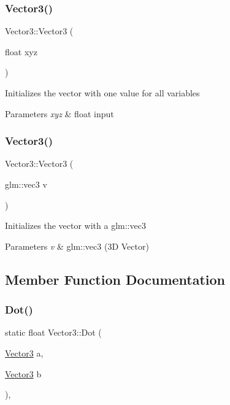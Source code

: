 \subsubsection{\texorpdfstring{Vector3()}{Vector3()}\hspace{0.1cm}{\footnotesize\ttfamily [3/4]}}
{\footnotesize\ttfamily Vector3\+::\+Vector3 (\begin{DoxyParamCaption}\item[{float}]{xyz }\end{DoxyParamCaption})\hspace{0.3cm}{\ttfamily [inline]}}

Initializes the vector with one value for all variables 
\begin{DoxyParams}{Parameters}
{\em xyz} & float input \\
\hline
\end{DoxyParams}
\mbox{\label{struct_vector3_a77b6e181107724282b7d95a4d22cfc59}} 
\subsubsection{\texorpdfstring{Vector3()}{Vector3()}\hspace{0.1cm}{\footnotesize\ttfamily [4/4]}}
{\footnotesize\ttfamily Vector3\+::\+Vector3 (\begin{DoxyParamCaption}\item[{glm\+::vec3}]{v }\end{DoxyParamCaption})\hspace{0.3cm}{\ttfamily [inline]}}

Initializes the vector with a glm\+::vec3 
\begin{DoxyParams}{Parameters}
{\em v} & glm\+::vec3 (3D Vector) \\
\hline
\end{DoxyParams}


\subsection{Member Function Documentation}
\mbox{\label{struct_vector3_abc6241be068bbf878c7b12b16582a1f4}} 
\subsubsection{\texorpdfstring{Dot()}{Dot()}}
{\footnotesize\ttfamily static float Vector3\+::\+Dot (\begin{DoxyParamCaption}\item[{\mbox{\hyperlink{struct_vector3}{Vector3}}}]{a,  }\item[{\mbox{\hyperlink{struct_vector3}{Vector3}}}]{b }\end{DoxyParamCaption})\hspace{0.3cm}{\ttfamily [inline]}, {\ttfamily [static]}}


